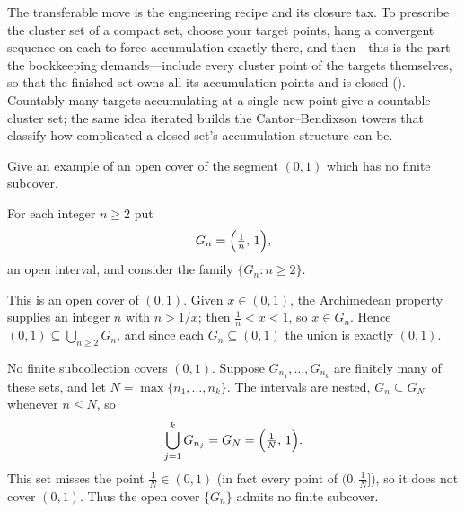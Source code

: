 \documentclass[main.tex]{subfiles}
\begin{document}
\begin{Reflection}
The transferable move is the engineering recipe and its closure tax. To prescribe the cluster set of a
compact set, choose your target points, hang a convergent sequence on each to force accumulation exactly
there, and then---this is the part the bookkeeping demands---include every cluster point of the targets
themselves, so that the finished set owns all its accumulation points and is closed
(). Countably many targets accumulating at a
single new point give a countable cluster set; the same idea iterated builds the Cantor--Bendixson towers
that classify how complicated a closed set's accumulation structure can be.
\end{Reflection}

Give an example of an open cover of the segment $(0,1)$ which has no finite subcover.

\begin{SolutionBlue}
For each integer $n\ge 2$ put
\[
G_n=\Bigl(\tfrac1n,\,1\Bigr),
\]
an open interval, and consider the family $\{G_n:n\ge 2\}$.

This is an open cover of $(0,1)$. Given $x\in(0,1)$, the Archimedean property supplies an integer
$n$ with $n>1/x$; then $\tfrac1n<x<1$, so $x\in G_n$. Hence $(0,1)\subseteq\bigcup_{n\ge 2}G_n$, and
since each $G_n\subseteq(0,1)$ the union is exactly $(0,1)$.

No finite subcollection covers $(0,1)$. Suppose $G_{n_1},\dots,G_{n_k}$ are finitely many of these
sets, and let $N=\max\{n_1,\dots,n_k\}$. The intervals are nested, $G_n\subseteq G_{N}$ whenever
$n\le N$, so
\[
\bigcup_{j=1}^{k}G_{n_j}=G_N=\Bigl(\tfrac1N,\,1\Bigr).
\]
This set misses the point $\tfrac1N\in(0,1)$ (in fact every point of $(0,\tfrac1N]$), so it does not
cover $(0,1)$. Thus the open cover $\{G_n\}$ admits no finite subcover.
\end{SolutionBlue}
\end{document}
